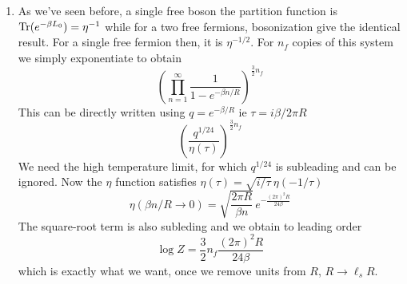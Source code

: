 \documentclass[11pt, class=article, crop=false]{standalone}
\begin{document}
\begin{enumerate}
	\item
	As we've seen before, a single free boson the partition function is $\mathrm{Tr}(e^{-\beta L_0}) = \eta^{-1}$ while for a two free fermions, bosonization give the identical result. For a single free fermion then, it is $\eta^{-1/2}$. For $n_f$ copies of this system we simply exponentiate to obtain
	\[
		\left(\prod_{n=1}^\infty \frac{1}{1-e^{-\beta n/R}} \right)^{\frac32 n_f}
	\]
	This can be directly written using $q = e^{-\beta/ R}$ ie $\tau = i \beta /2 \pi R$
	\[
		\left(\frac{q^{1/{24}}}{\eta(\tau)}\right)^{\frac32 n_f}
	\]
	We need the high temperature limit, for which $q^{1/24}$ is subleading and can be ignored. 
	Now the $\eta$ function satisfies $\eta(\tau) = \sqrt{i/\tau} \, \eta(-1/\tau)$ 
	\[
		\eta(\beta n/R \to 0) = \sqrt{\frac{2 \pi R}{\beta n}}\, e^{-\frac{(2 \pi)^2 R}{24 \beta}}
	\]
	The square-root term is also subleding and we obtain to leading order
	\[
		\log Z = \frac32 n_f \frac{(2\pi)^2 R}{24 \beta}
	\]
	which is exactly what we want, once we remove units from $R$, $R \to \ell_s R$.
	
\end{enumerate}
\end{document}
